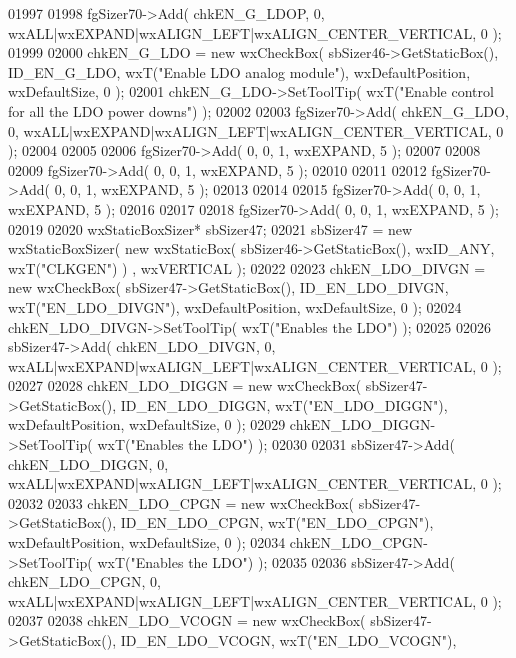 \begin{DoxyCode}
01997     
01998     fgSizer70->Add( chkEN_G_LDOP, 0, wxALL|wxEXPAND|wxALIGN\_LEFT|wxALIGN\_CENTER\_VERTICAL, 0 );
01999     
02000     chkEN_G_LDO = \textcolor{keyword}{new} wxCheckBox( sbSizer46->GetStaticBox(), ID_EN_G_LDO, wxT(\textcolor{stringliteral}{"Enable LDO analog module"}), 
      wxDefaultPosition, wxDefaultSize, 0 );
02001     chkEN_G_LDO->SetToolTip( wxT(\textcolor{stringliteral}{"Enable control for all the LDO power downs"}) );
02002     
02003     fgSizer70->Add( chkEN_G_LDO, 0, wxALL|wxEXPAND|wxALIGN\_LEFT|wxALIGN\_CENTER\_VERTICAL, 0 );
02004     
02005     
02006     fgSizer70->Add( 0, 0, 1, wxEXPAND, 5 );
02007     
02008     
02009     fgSizer70->Add( 0, 0, 1, wxEXPAND, 5 );
02010     
02011     
02012     fgSizer70->Add( 0, 0, 1, wxEXPAND, 5 );
02013     
02014     
02015     fgSizer70->Add( 0, 0, 1, wxEXPAND, 5 );
02016     
02017     
02018     fgSizer70->Add( 0, 0, 1, wxEXPAND, 5 );
02019     
02020     wxStaticBoxSizer* sbSizer47;
02021     sbSizer47 = \textcolor{keyword}{new} wxStaticBoxSizer( \textcolor{keyword}{new} wxStaticBox( sbSizer46->GetStaticBox(), wxID\_ANY, wxT(\textcolor{stringliteral}{"CLKGEN"}) )
      , wxVERTICAL );
02022     
02023     chkEN_LDO_DIVGN = \textcolor{keyword}{new} wxCheckBox( sbSizer47->GetStaticBox(), ID_EN_LDO_DIVGN, wxT(\textcolor{stringliteral}{"EN\_LDO\_DIVGN"}), 
      wxDefaultPosition, wxDefaultSize, 0 );
02024     chkEN_LDO_DIVGN->SetToolTip( wxT(\textcolor{stringliteral}{"Enables the LDO"}) );
02025     
02026     sbSizer47->Add( chkEN_LDO_DIVGN, 0, wxALL|wxEXPAND|wxALIGN\_LEFT|wxALIGN\_CENTER\_VERTICAL, 0 );
02027     
02028     chkEN_LDO_DIGGN = \textcolor{keyword}{new} wxCheckBox( sbSizer47->GetStaticBox(), ID_EN_LDO_DIGGN, wxT(\textcolor{stringliteral}{"EN\_LDO\_DIGGN"}), 
      wxDefaultPosition, wxDefaultSize, 0 );
02029     chkEN_LDO_DIGGN->SetToolTip( wxT(\textcolor{stringliteral}{"Enables the LDO"}) );
02030     
02031     sbSizer47->Add( chkEN_LDO_DIGGN, 0, wxALL|wxEXPAND|wxALIGN\_LEFT|wxALIGN\_CENTER\_VERTICAL, 0 );
02032     
02033     chkEN_LDO_CPGN = \textcolor{keyword}{new} wxCheckBox( sbSizer47->GetStaticBox(), ID_EN_LDO_CPGN, wxT(\textcolor{stringliteral}{"EN\_LDO\_CPGN"}), 
      wxDefaultPosition, wxDefaultSize, 0 );
02034     chkEN_LDO_CPGN->SetToolTip( wxT(\textcolor{stringliteral}{"Enables the LDO"}) );
02035     
02036     sbSizer47->Add( chkEN_LDO_CPGN, 0, wxALL|wxEXPAND|wxALIGN\_LEFT|wxALIGN\_CENTER\_VERTICAL, 0 );
02037     
02038     chkEN_LDO_VCOGN = \textcolor{keyword}{new} wxCheckBox( sbSizer47->GetStaticBox(), ID_EN_LDO_VCOGN, wxT(\textcolor{stringliteral}{"EN\_LDO\_VCOGN"}), 

\end{DoxyCode}
